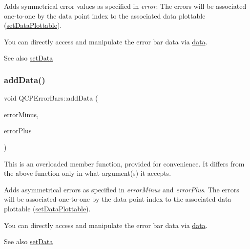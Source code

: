 Adds symmetrical error values as specified in {\itshape error}. The errors will be associated one-\/to-\/one by the data point index to the associated data plottable (\hyperlink{class_q_c_p_error_bars_aabb42a964cfbf780cd1c79850c7cd989}{set\+Data\+Plottable}).

You can directly access and manipulate the error bar data via \hyperlink{class_q_c_p_error_bars_aeebd1b14f4c3573565efafd514988813}{data}.

\begin{DoxySeeAlso}{See also}
\hyperlink{class_q_c_p_error_bars_a92b1980003255f5f7c05407a4d92aabc}{set\+Data} 
\end{DoxySeeAlso}
\mbox{\label{class_q_c_p_error_bars_a2135cf41d7925a3dcdadd4eb03fd3eb6}} 
\subsubsection{\texorpdfstring{add\+Data()}{addData()}\hspace{0.1cm}{\footnotesize\ttfamily [2/4]}}
{\footnotesize\ttfamily void Q\+C\+P\+Error\+Bars\+::add\+Data (\begin{DoxyParamCaption}\item[{const Q\+Vector$<$ double $>$ \&}]{error\+Minus,  }\item[{const Q\+Vector$<$ double $>$ \&}]{error\+Plus }\end{DoxyParamCaption})}

This is an overloaded member function, provided for convenience. It differs from the above function only in what argument(s) it accepts.

Adds asymmetrical errors as specified in {\itshape error\+Minus} and {\itshape error\+Plus}. The errors will be associated one-\/to-\/one by the data point index to the associated data plottable (\hyperlink{class_q_c_p_error_bars_aabb42a964cfbf780cd1c79850c7cd989}{set\+Data\+Plottable}).

You can directly access and manipulate the error bar data via \hyperlink{class_q_c_p_error_bars_aeebd1b14f4c3573565efafd514988813}{data}.

\begin{DoxySeeAlso}{See also}
\hyperlink{class_q_c_p_error_bars_a92b1980003255f5f7c05407a4d92aabc}{set\+Data} 
\end{DoxySeeAlso}
\mbox{\label{class_q_c_p_error_bars_a39ef73b0e61941fc4064fd3a5224c72a}} 
